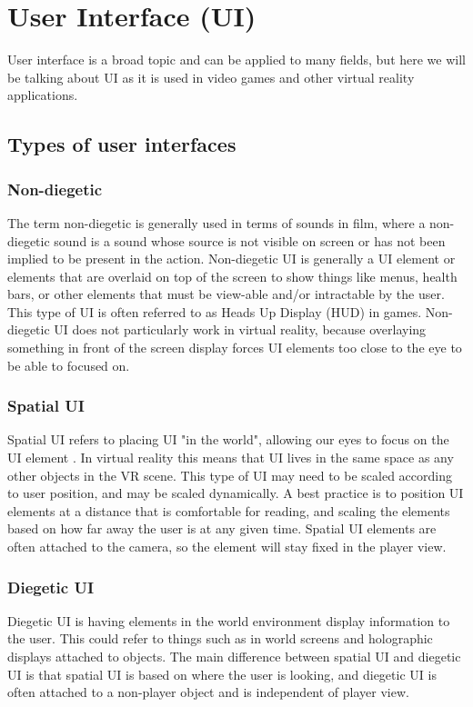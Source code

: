 \documentclass[onecolumn, draftclsnofoot,10pt, compsoc]{IEEEtran}
\begin{document}
\section{User Interface (UI)}
User interface is a broad topic and can be applied to many fields, but here we will be talking about UI as it is used in video games and other virtual reality applications. 

\subsection{Types of user interfaces}

\subsubsection{Non-diegetic}
The term non-diegetic is generally used in terms of sounds in film, where a non-diegetic sound is a sound whose source is not visible on screen or has not been implied to be present in the action. Non-diegetic UI is generally a UI element or elements that are overlaid on top of the screen to show things like menus, health bars, or other elements that must be view-able and/or intractable by the user. This type of UI is often referred to as Heads Up Display (HUD) in games. Non-diegetic UI does not particularly work in virtual reality, because overlaying something in front of the screen display forces UI elements too close to the eye to be able to focused on.    

\subsubsection{Spatial UI}
Spatial UI refers to placing UI "in the world", allowing our eyes to focus on the UI element \cite{unity}. In virtual reality this means that UI lives in the same space as any other objects in the VR scene. This type of UI may need to be scaled according to user position, and may be scaled dynamically. A best practice is to position UI elements at a distance that is comfortable for reading, and scaling the elements based on how far away the user is at any given time. Spatial UI elements are often attached to the camera, so the element will stay fixed in the player view.

\subsubsection{Diegetic UI}
Diegetic UI is having elements in the world environment display information to the user. This could refer to things such as in world screens and holographic displays attached to objects. The main difference between spatial UI and diegetic UI is that spatial UI is based on where the user is looking, and diegetic UI is often attached to a non-player object and is independent of player view.  
\end{document}
